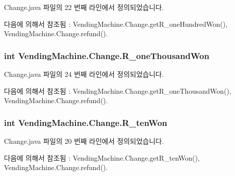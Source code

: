 Change.\+java 파일의 22 번째 라인에서 정의되었습니다.



다음에 의해서 참조됨 \+:  Vending\+Machine.\+Change.\+get\+R\+\_\+one\+Hundred\+Won(), Vending\+Machine.\+Change.\+refund().

\subsubsection[{\texorpdfstring{R\+\_\+one\+Thousand\+Won}{R_oneThousandWon}}]{\setlength{\rightskip}{0pt plus 5cm}int Vending\+Machine.\+Change.\+R\+\_\+one\+Thousand\+Won\hspace{0.3cm}{\ttfamily [private]}}\hypertarget{class_vending_machine_1_1_change_aedcf39060a7c95aa27cce2d74853a16a}{}\label{class_vending_machine_1_1_change_aedcf39060a7c95aa27cce2d74853a16a}


Change.\+java 파일의 24 번째 라인에서 정의되었습니다.



다음에 의해서 참조됨 \+:  Vending\+Machine.\+Change.\+get\+R\+\_\+one\+Thousand\+Won(), Vending\+Machine.\+Change.\+refund().

\subsubsection[{\texorpdfstring{R\+\_\+ten\+Won}{R_tenWon}}]{\setlength{\rightskip}{0pt plus 5cm}int Vending\+Machine.\+Change.\+R\+\_\+ten\+Won\hspace{0.3cm}{\ttfamily [private]}}\hypertarget{class_vending_machine_1_1_change_ade66d07bd5a80d7ea0dfc34704714243}{}\label{class_vending_machine_1_1_change_ade66d07bd5a80d7ea0dfc34704714243}


Change.\+java 파일의 20 번째 라인에서 정의되었습니다.



다음에 의해서 참조됨 \+:  Vending\+Machine.\+Change.\+get\+R\+\_\+ten\+Won(), Vending\+Machine.\+Change.\+refund().

